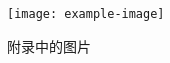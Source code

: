 \cleardoublepage
{

    \appendixsecmajornumbering


    \begin{figure}[htb]
        \centering
        \texttt{[image: example-image]}
        \caption{附录中的图片}
        \label{fig:test-appendix}
    \end{figure}


}